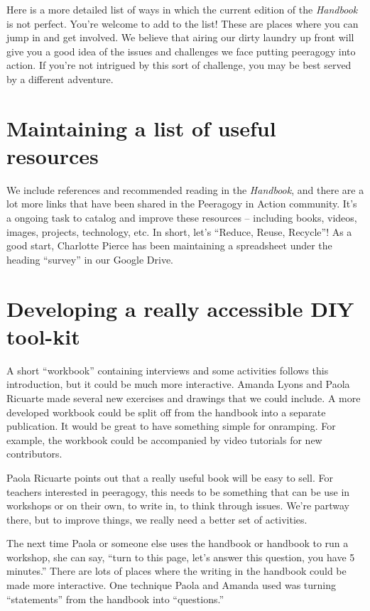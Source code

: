 Here is a more detailed list of ways in which the current edition of the
\emph{Handbook} is not perfect. You're welcome to add to the list! These
are places where you can jump in and get involved. We believe that
airing our dirty laundry up front will give you a good idea of the
issues and challenges we face putting peeragogy into action. If you're
not intrigued by this sort of challenge, you may be best served by a
different adventure.

\section*{Maintaining a list of useful
resources}\label{maintaining-a-list-of-useful-resources}

We include references and recommended reading in the \emph{Handbook},
and there are a lot more links that have been shared in the Peeragogy in
Action community. It's a ongoing task to catalog and improve these
resources -- including books, videos, images, projects, technology, etc.
In short, let's ``Reduce, Reuse, Recycle''! As a good start, Charlotte
Pierce has been maintaining a spreadsheet under the heading ``survey''
in our Google Drive.

\section*{Developing a really accessible DIY
tool-kit}\label{developing-a-really-accessible-diy-tool-kit}

A short ``workbook'' containing interviews and some activities follows
this introduction, but it could be much more interactive. Amanda Lyons
and Paola Ricuarte made several new exercises and drawings that we could
include. A more developed workbook could be split off from the handbook
into a separate publication. It would be great to have something simple
for onramping. For example, the workbook could be accompanied by video
tutorials for new contributors.

Paola Ricuarte points out that a really useful book will be easy to
sell. For teachers interested in peeragogy, this needs to be something
that can be use in workshops or on their own, to write in, to think
through issues. We're partway there, but to improve things, we really
need a better set of activities.

The next time Paola or someone else uses the handbook or handbook to run
a workshop, she can say, ``turn to this page, let's answer this
question, you have 5 minutes.'' There are lots of places where the
writing in the handbook could be made more interactive. One technique
Paola and Amanda used was turning ``statements'' from the handbook into
``questions.''

